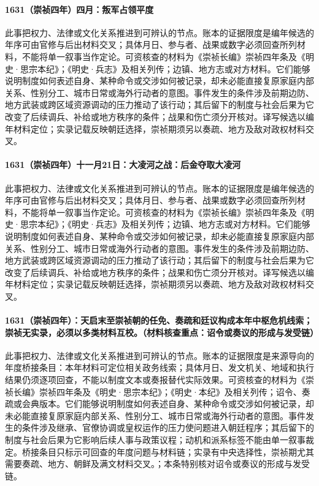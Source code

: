 \paragraph{1631（崇祯四年）四月：叛军占领平度} 此事把权力、法律或文化关系推进到可辨认的节点。账本的证据限度是编年候选的年序可由官修与后出材料交叉；具体月日、参与者、战果或数字必须回查所列材料，不能将单一叙事当作定论。可资核查的材料为《崇祯长编》崇祯四年条及《明史·思宗本纪》；《明史·兵志》及相关列传；边镇、地方志或对方材料。它们能够说明制度如何表述自身、某种命令或交涉如何被记录，却未必能直接复原家庭内部关系、性别分工、城市日常或海外行动者的意图。事件发生的条件涉及前期边防、地方武装或跨区域资源调动的压力推动了该行动；其后留下的制度与社会后果为它改变了后续调兵、补给或地方秩序的条件；战果和伤亡须分开核对。译写候选以编年材料定位；实录记载反映朝廷选择，崇祯期须另以奏疏、地方及敌对政权材料交叉。

\paragraph{1631（崇祯四年）十一月21日：大凌河之战：后金夺取大凌河} 此事把权力、法律或文化关系推进到可辨认的节点。账本的证据限度是编年候选的年序可由官修与后出材料交叉；具体月日、参与者、战果或数字必须回查所列材料，不能将单一叙事当作定论。可资核查的材料为《崇祯长编》崇祯四年条及《明史·思宗本纪》；《明史·兵志》及相关列传；边镇、地方志或对方材料。它们能够说明制度如何表述自身、某种命令或交涉如何被记录，却未必能直接复原家庭内部关系、性别分工、城市日常或海外行动者的意图。事件发生的条件涉及前期边防、地方武装或跨区域资源调动的压力推动了该行动；其后留下的制度与社会后果为它改变了后续调兵、补给或地方秩序的条件；战果和伤亡须分开核对。译写候选以编年材料定位；实录记载反映朝廷选择，崇祯期须另以奏疏、地方及敌对政权材料交叉。

\paragraph{1631（崇祯四年）：天启末至崇祯朝的任免、奏疏和廷议构成本年中枢危机线索；崇祯无实录，必须以多类材料互校。（材料核查重点：诏令或奏议的形成与发受链）} 此事把权力、法律或文化关系推进到可辨认的节点。账本的证据限度是来源导向的年度桥接条目：本年材料可定位相关政务线索；具体月日、发文机关、地域和执行结果仍须逐项回查，不能以制度文本或奏报替代实际效果。可资核查的材料为《崇祯长编》崇祯四年条及《明史·思宗本纪》；《明史·本纪》及相关列传；诏令、奏疏或会典版本。它们能够说明制度如何表述自身、某种命令或交涉如何被记录，却未必能直接复原家庭内部关系、性别分工、城市日常或海外行动者的意图。事件发生的条件涉及继承、官僚协调或皇权运作的压力使问题进入朝廷程序；其后留下的制度与社会后果为它影响后续人事与政策议程；动机和派系标签不能由单一叙事裁定。桥接条目只标示可回查的年度问题与材料链；实录有中央选择性，崇祯期尤其需要奏疏、地方、朝鲜及满文材料交叉。；本条特别核对诏令或奏议的形成与发受链。


